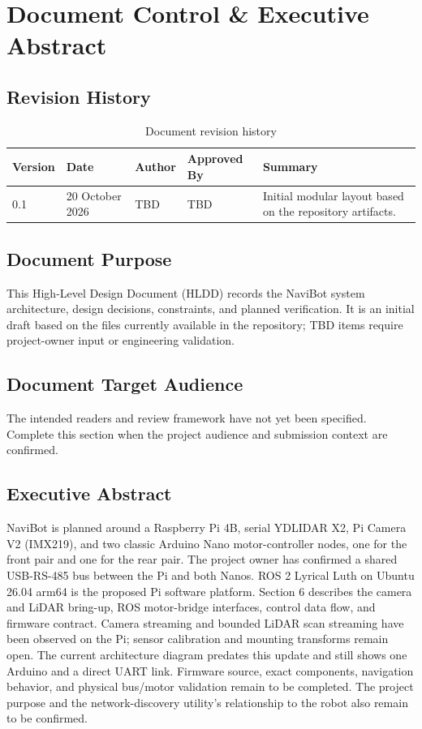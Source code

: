 \section{Document Control \& Executive Abstract}

\subsection{Revision History}
\begin{table}[!htbp]
    \centering
    \small
    \begin{tabular}{llllp{6cm}}
        \toprule
        \textbf{Version} & \textbf{Date} & \textbf{Author} & \textbf{Approved By} & \textbf{Summary} \\
        \midrule
        0.1 & 20 October 2026 & TBD & TBD & Initial modular layout based on the repository artifacts. \\
        \bottomrule
    \end{tabular}
    \caption{Document revision history}
\end{table}

\subsection{Document Purpose}
This High-Level Design Document (HLDD) records the NaviBot system architecture, design decisions, constraints, and planned verification. It is an initial draft based on the files currently available in the repository; TBD items require project-owner input or engineering validation.

\subsection{Document Target Audience}
The intended readers and review framework have not yet been specified. Complete this section when the project audience and submission context are confirmed.

\subsection{Executive Abstract}
NaviBot is planned around a Raspberry Pi 4B, serial YDLIDAR X2, Pi Camera V2 (IMX219), and two classic Arduino Nano motor-controller nodes, one for the front pair and one for the rear pair. The project owner has confirmed a shared USB-RS-485 bus between the Pi and both Nanos. ROS 2 Lyrical Luth on Ubuntu 26.04 arm64 is the proposed Pi software platform. Section 6 describes the camera and LiDAR bring-up, ROS motor-bridge interfaces, control data flow, and firmware contract. Camera streaming and bounded LiDAR scan streaming have been observed on the Pi; sensor calibration and mounting transforms remain open. The current architecture diagram predates this update and still shows one Arduino and a direct UART link. Firmware source, exact components, navigation behavior, and physical bus/motor validation remain to be completed. The project purpose and the network-discovery utility's relationship to the robot also remain to be confirmed.
